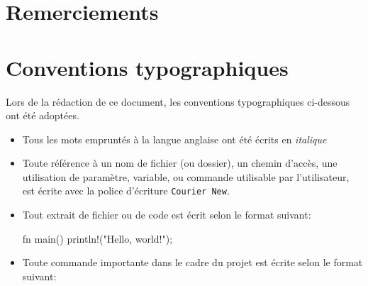 \documentclass[a4paper, 12pt]{article}
\begin{document}
\newpage
\listoffigures
{}

\newpage
\renewcommand{\listtablename}{Table des tables}
\listoftables
{}

\newpage
\renewcommand\listoflistingscaption{Table des listings de code}
\listoflistings
{}
\newpage

\section*{Remerciements}
\newpage

\section*{Conventions typographiques}
Lors de la rédaction de ce document, les conventions typographiques ci-dessous ont
été adoptées.
\begin{itemize}[label=\textbullet]
	\item Tous les mots empruntés à la langue anglaise ont été écrits en \textit{italique}
	\item Toute référence à un nom de fichier (ou dossier), un chemin d’accès, une 
    utilisation de paramètre, variable, ou commande utilisable par l’utilisateur, 
    est écrite avec la police d’écriture \texttt{Courier New}.
	\item Tout extrait de fichier ou de code est écrit selon le format suivant:
\begin{rustcode}
fn main() {
    println!("Hello, world!");
}
\end{rustcode}
    \item Toute commande importante dans le cadre du projet est écrite selon le
    format suivant:
\end{itemize}
\newpage
\end{document}
